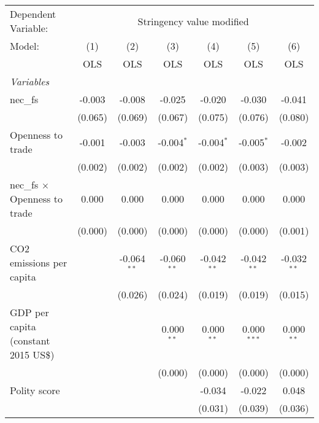 
\begingroup
\centering
\begin{tabular}{lcccccc}
   \toprule
   Dependent Variable: & \multicolumn{6}{c}{Stringency value modified}\\
   Model:                               & (1)     & (2)           & (3)           & (4)           & (5)           & (6)\\  
                                        &  OLS    & OLS           & OLS           & OLS           & OLS           & OLS\\  
   \midrule
   \emph{Variables}\\
   nec\_fs                              & -0.003  & -0.008        & -0.025        & -0.020        & -0.030        & -0.041\\   
                                        & (0.065) & (0.069)       & (0.067)       & (0.075)       & (0.076)       & (0.080)\\   
   Openness to trade                    & -0.001  & -0.003        & -0.004$^{*}$  & -0.004$^{*}$  & -0.005$^{*}$  & -0.002\\   
                                        & (0.002) & (0.002)       & (0.002)       & (0.002)       & (0.003)       & (0.003)\\   
   nec\_fs $\times$ Openness to trade   & 0.000   & 0.000         & 0.000         & 0.000         & 0.000         & 0.000\\   
                                        & (0.000) & (0.000)       & (0.000)       & (0.000)       & (0.000)       & (0.001)\\   
   CO2 emissions per capita             &         & -0.064$^{**}$ & -0.060$^{**}$ & -0.042$^{**}$ & -0.042$^{**}$ & -0.032$^{**}$\\   
                                        &         & (0.026)       & (0.024)       & (0.019)       & (0.019)       & (0.015)\\   
   GDP per capita (constant 2015 US\$)  &         &               & 0.000$^{**}$  & 0.000$^{**}$  & 0.000$^{***}$ & 0.000$^{**}$\\   
                                        &         &               & (0.000)       & (0.000)       & (0.000)       & (0.000)\\   
   Polity score                         &         &               &               & -0.034        & -0.022        & 0.048\\   
                                        &         &               &               & (0.031)       & (0.039)       & (0.036)\\   

\end{tabular}
